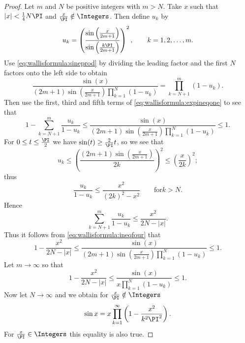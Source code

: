 \documentclass[12pt]{article}
\begin{document}
\begin{proof}
    Let \( m \) and \( N \) be positive integers with \( m > N \).  Take
    \( x \) such that \( |x| < \frac{1}{4} N \PI \) and \( \frac{x}{\PI}
    \notin \Integers \).  Then define \( u_k \) by
    \[
        u_k = \left( \frac{\sin\left( \frac{x}{2m+1} \right)}{\sin\left(
        \frac{k\PI}{2m+1} \right)} \right)^2, \qquad k = 1,2,\dots,m.
    \] Use \eqref{eq:wallisformula:sineprod} by dividing the leading
    factor and the first \( N \) factors onto the left side to obtain
    \[
        \frac{\sin(x)}{(2m+1) \sin\left( \frac{x}{2m+1} \right) \prod_{k=1}^
        {N}(1-u_k)} = \prod_{k=N+1}^{m} (1-u_k).
    \] Then use the first, third and fifth terms of \eqref{eq:wallisformula:expineqone}
    to see that
    \begin{equation}
        \label{eq:wallisformula:ineqfour} 1 - \sum_{k=N+1}^{m} \frac{u_k}
        {1-u_k} \le \frac{\sin(x)}{(2m+1) \sin\left( \frac{x}{2m+1}
        \right) \prod_{k=1}^{N}(1-u_k)} \le 1.
    \end{equation}
    For \( 0 \le t \le \frac{\PI}{2} \) we have \( \sin(t) \ge \frac{2}{\PI}
    t \), so we see that
    \[
        u_k \le \left( \frac{(2m+1)\sin\left( \frac{x}{2m+1} \right)}{2k}\right)^2
        \le \left( \frac{x}{2k} \right)^2;
    \] thus
    \[
        \frac{u_k}{1-u_k} \le \frac{x^2}{(2k)^2 - x^2} \qquad \text{for}
        k > N.
    \] Hence
    \[
        \sum_{k=N+1}^{m} \frac{u_k}{1-u_k} \le \frac{x^2}{2N-|x|}.
    \] Thus it follows from \eqref{eq:wallisformula:ineqfour} that
    \[
        1 - \frac{x^2}{2N-|x|} \le \frac{\sin(x)}{(2m+1) \sin\left(
        \frac {x}{2m+1} \right) \prod_{k=1}^{N}(1-u_k)} \le 1.
    \] Let \( m \to \infty \) so that
    \[
        1 - \frac{x^2}{2N-|x|} \le \frac{\sin(x)}{x \prod_{k=1}^{N}(1-u_k)}
        \le 1.
    \] Now let \( N \to \infty \) and we obtain for \( \frac{x}{\PI}
    \notin \Integers \)
    \[
        \sin x = x \prod_{k=1}^{\infty} \left( 1 - \frac{x^2}{k^2 \PI^2}
        \right).
    \] For \( \frac{x}{\PI} \in \Integers \) this equality is also true.
\end{proof}
\end{document}
